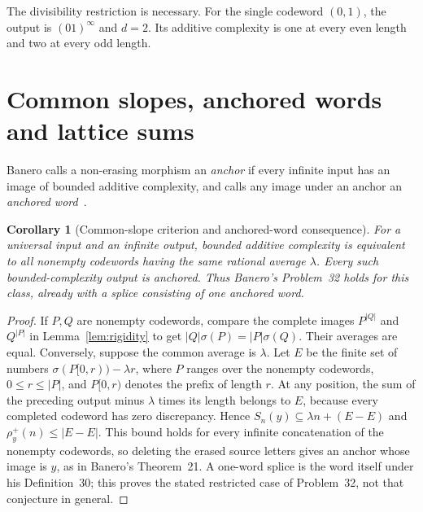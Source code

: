 \documentclass[11pt]{article}
\newtheorem{corollary}[theorem]{Corollary}
\newcommand{\sumword}[1]{\sigma(#1)}
\begin{document}
The divisibility restriction is necessary. For the single codeword
$(0,1)$, the output is $(01)^{\infty}$ and $d=2$. Its additive complexity
is one at every even length and two at every odd length.

\section{Common slopes, anchored words and lattice sums}
Banero calls a non-erasing morphism an \emph{anchor} if every infinite
input has an image of bounded additive complexity, and calls any image
under an anchor an \emph{anchored word}~\cite[Definition~20 and Section~3.3]{banero}.

\begin{corollary}[Common-slope criterion and anchored-word consequence]\label{cor:anchor}
For a universal input and an infinite output, bounded additive complexity
is equivalent to all nonempty codewords having the same rational average
$\lambda$. Every such bounded-complexity output is anchored.
Thus Banero's Problem~32 holds for this class, already with a splice
consisting of one anchored word.
\end{corollary}
\begin{proof}
If $P,Q$ are nonempty codewords, compare the complete images
$P^{|Q|}$ and $Q^{|P|}$ in Lemma~\ref{lem:rigidity} to get
$|Q|\sumword{P}=|P|\sumword{Q}$. Their averages are equal.
Conversely, suppose the common average is $\lambda$. Let $E$ be the
finite set of numbers $\sumword{P[0,r)}-\lambda r$, where $P$ ranges
over the nonempty codewords, $0\leq r\leq |P|$, and $P[0,r)$ denotes
the prefix of length $r$.
At any position, the sum of the preceding output minus $\lambda$
times its length belongs to $E$, because every completed codeword has
zero discrepancy. Hence
$S_n(y)\subseteq\lambda n+(E-E)$ and $\rho_y^+(n)\leq |E-E|$.
This bound holds for every infinite concatenation of the nonempty
codewords, so deleting the erased source letters gives an anchor whose
image is $y$, as in Banero's Theorem~21. A one-word splice is the word
itself under his Definition~30; this proves the stated restricted case
of Problem~32, not that conjecture in general.
\end{proof}
\end{document}
